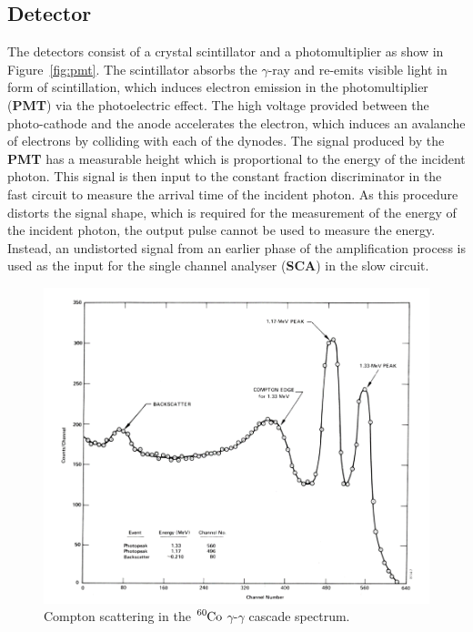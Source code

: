 \documentclass[twocolumn]{article}
\begin{document}
\subsection{Detector}
The detectors consist of a crystal scintillator and a photomultiplier as show in Figure~\ref{fig:pmt}. The scintillator absorbs the $\gamma$-ray and re-emits visible light in form of scintillation, which induces electron emission in the photomultiplier (\textbf{PMT}) via the photoelectric effect. The high voltage provided between the photo-cathode and the anode accelerates the electron, which induces an avalanche of electrons by colliding with each of the dynodes. The signal produced by the \textbf{PMT} has a measurable height which is proportional to the energy of the incident photon. This signal is then input to the constant fraction discriminator in the fast circuit to measure the arrival time of the incident photon. As this procedure distorts the signal shape, which is required for the measurement of the energy of the incident photon, the output pulse cannot be used to measure the energy. Instead, an undistorted signal from an earlier phase of the amplification process is used as the input for the single channel analyser (\textbf{SCA}) in the slow circuit.
 \begin{figure}[!h]
 	\centering
 	\includegraphics[width=1\linewidth]{Compt.png}
 	\caption{Compton scattering in the $\ce{^{60}Co}$ $\gamma$-$\gamma$ cascade spectrum\cite{Compt}.} 
 	\label{fig:Compt}
 \end{figure}
\end{document}
